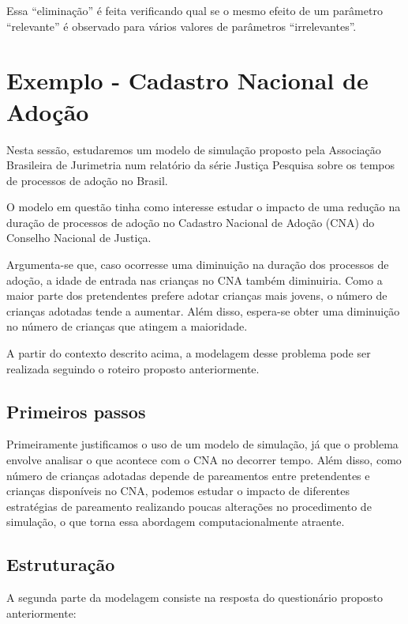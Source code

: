 \documentclass[]{book}
\begin{document}
Essa ``eliminação'' é feita verificando qual se o mesmo efeito de um
parâmetro ``relevante'' é observado para vários valores de parâmetros
``irrelevantes''.

\section{Exemplo - Cadastro Nacional de
Adoção}\label{exemplo---cadastro-nacional-de-adocao}

Nesta sessão, estudaremos um modelo de simulação proposto pela
Associação Brasileira de Jurimetria num relatório da série Justiça
Pesquisa sobre os tempos de processos de adoção no Brasil.

O modelo em questão tinha como interesse estudar o impacto de uma
redução na duração de processos de adoção no Cadastro Nacional de Adoção
(CNA) do Conselho Nacional de Justiça.

Argumenta-se que, caso ocorresse uma diminuição na duração dos processos
de adoção, a idade de entrada nas crianças no CNA também diminuiria.
Como a maior parte dos pretendentes prefere adotar crianças mais jovens,
o número de crianças adotadas tende a aumentar. Além disso, espera-se
obter uma diminuição no número de crianças que atingem a maioridade.

A partir do contexto descrito acima, a modelagem desse problema pode ser
realizada seguindo o roteiro proposto anteriormente.

\subsection{Primeiros passos}\label{primeiros-passos-1}

Primeiramente justificamos o uso de um modelo de simulação, já que o
problema envolve analisar o que acontece com o CNA no decorrer tempo.
Além disso, como número de crianças adotadas depende de pareamentos
entre pretendentes e crianças disponíveis no CNA, podemos estudar o
impacto de diferentes estratégias de pareamento realizando poucas
alterações no procedimento de simulação, o que torna essa abordagem
computacionalmente atraente.

\subsection{Estruturação}\label{estruturacao-1}

A segunda parte da modelagem consiste na resposta do questionário
proposto anteriormente:
\end{document}
